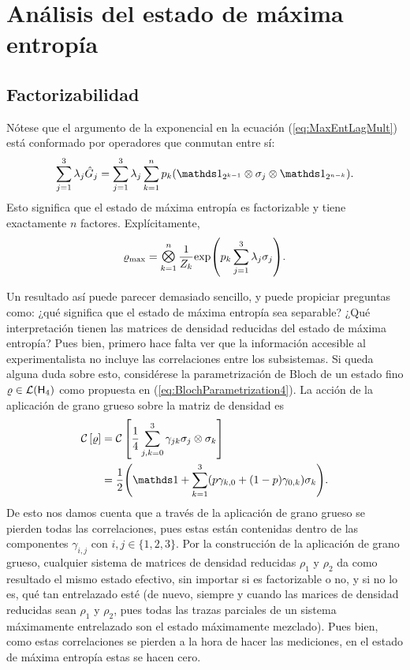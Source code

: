\section{Análisis del estado de máxima entropía}

\subsection{Factorizabilidad}

Nótese que el argumento de la exponencial en la ecuación (\ref{eq:MaxEntLagMult}) está conformado por operadores que conmutan entre sí:
\begin{equation}
    \sum_{j=1}^{3}\lambda_{j}\hat{G}_{j}=\sum_{j=1}^{3}\lambda_{j}\sum_{k=1}^{n}p_{k}(\Id_{2^{k-1}}\otimes\sigma_{j}\otimes\Id_{2^{n-k}}).\nonumber
\end{equation}
Esto significa que el estado de máxima entropía es factorizable y tiene exactamente $n$ factores. Explícitamente,
\begin{equation}\label{eq:MaxEntSeparable}
    \varrho_{\max}=\Motimes_{k=1}^{n}\frac{1}{Z_{k}}\text{exp}\qty(p_{k}\sum_{j=1}^{3}\lambda_{j}\sigma_{j}).
\end{equation}

Un resultado así puede parecer demasiado sencillo, y puede propiciar preguntas como: ¿qué significa que el estado de máxima entropía sea separable? ¿Qué interpretación tienen las matrices de densidad reducidas del estado de máxima entropía? Pues bien, primero hace falta ver que la información accesible al experimentalista no incluye las correlaciones entre los subsistemas. Si queda alguna duda sobre esto, considérese la parametrización de Bloch de un estado fino $\varrho\in\mathcal{L}({\sf H}_{4})$ como propuesta en (\ref{eq:BlochParametrization4}). La acción de la aplicación de grano grueso sobre la matriz de densidad es
\begin{align}
    \CG{\varrho}&=\CG{\frac{1}{4}\sum_{j,k=0}^{3}\gamma_{jk}\pauli{j}\otimes \pauli{k}}\nonumber\\
    &=\frac{1}{2}\qty(\Id+\sum_{k=1}^{3}(p\gamma_{k,0}+(1-p)\gamma_{0,k})\sigma_{k}).\nonumber
\end{align}
De esto nos damos cuenta que a través de la aplicación de grano grueso se pierden todas las correlaciones, pues estas están contenidas dentro de las componentes $\gamma_{i,j}$ con $i,j\in\{1,2,3\}$. Por la construcción de la aplicación de grano grueso, cualquier sistema de matrices de densidad reducidas $\rho_{1}$ y $\rho_{2}$ da como resultado el mismo estado efectivo, sin importar si es factorizable o no, y si no lo es, qué tan entrelazado esté (de nuevo, siempre y cuando las marices de densidad reducidas sean $\rho_{1}$ y $\rho_{2}$, pues todas las trazas parciales de un sistema máximamente entrelazado son el estado máximamente mezclado). Pues bien, como estas correlaciones se pierden a la hora de hacer las mediciones, en el estado de máxima entropía estas se hacen cero.

